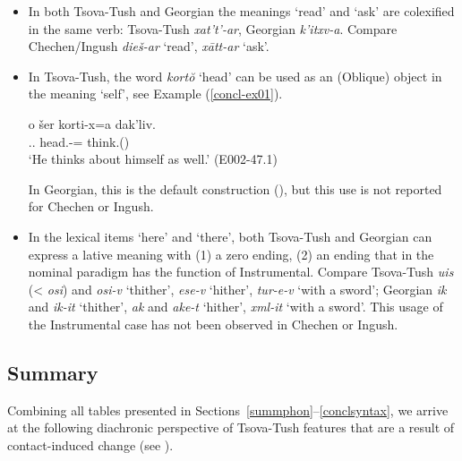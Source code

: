 \begin{itemize}
	\item In both Tsova-Tush and Georgian the meanings `read' and `ask' are colexified in the same verb: Tsova-Tush \textit{xat't'-ar}, Georgian \textit{k'itxv-a}. Compare Chechen/Ingush \textit{dieš-ar} `read', \textit{x\={a}tt-ar} `ask'.
	
	\item In Tsova-Tush, the word \textit{kort\u{o}} `head' can be used as an (Oblique) object in the meaning `self', see Example (\ref{concl-ex01}). 
	
	\begin{samepage}	
		\begin{exe}
			\ex\label{concl-ex01}
			\gll o šer korti-x=a dak'liv. \\
			{\Dist} {\Refl}.{\Gen}.{\Obl} head.{\Obl}-{\Cont}={\Add} think.{\Ipfv}({\Npst}) \\
			\trans `He thinks about himself as well.'
			\hfill (E002-47.1)
		\end{exe}
	\end{samepage}
	
	In Georgian, this is the default construction (\cite[84]{hewitt95}), but this use is not reported for Chechen or Ingush.
	
	\item In the lexical items `here' and `there', both Tsova-Tush and Georgian can express a lative meaning with (1) a zero ending, (2) an ending that in the nominal paradigm has the function of Instrumental. Compare Tsova-Tush \textit{uis} (< \textit{osi}) and \textit{osi-v} `thither', \textit{ese-v} `hither', \textit{tur-e-v} `with a sword'; Georgian \textit{ik} and \textit{ik-it} `thither', \textit{ak} and \textit{ake-t} `hither', \textit{xml-it} `with a sword'. This usage of the Instrumental case has not been observed in Chechen or Ingush.
	
	
	
\end{itemize}

\subsection{Summary} \label{summary}
Combining all tables presented in Sections~\ref{summphon}--\ref{conclsyntax}, we arrive at the following diachronic perspective of Tsova-Tush features that are a result of contact-induced change (see ).



